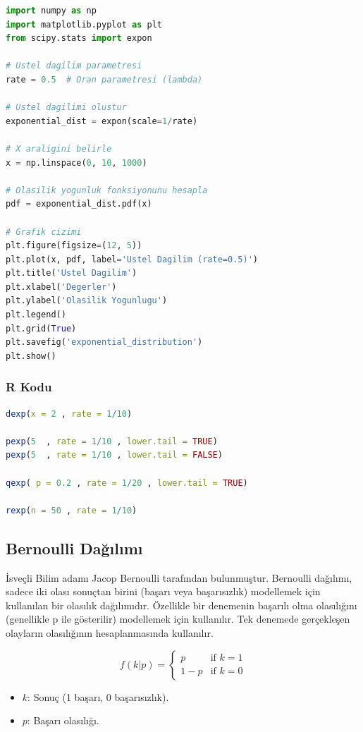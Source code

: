 \begin{lstlisting}[language=Python]
import numpy as np
import matplotlib.pyplot as plt
from scipy.stats import expon

# Ustel dagilim parametresi
rate = 0.5  # Oran parametresi (lambda)

# Ustel dagilimi olustur
exponential_dist = expon(scale=1/rate)

# X araligini belirle
x = np.linspace(0, 10, 1000)

# Olasilik yogunluk fonksiyonunu hesapla
pdf = exponential_dist.pdf(x)

# Grafik cizimi
plt.figure(figsize=(12, 5))
plt.plot(x, pdf, label='Ustel Dagilim (rate=0.5)')
plt.title('Ustel Dagilim')
plt.xlabel('Degerler')
plt.ylabel('Olasilik Yogunlugu')
plt.legend()
plt.grid(True)
plt.savefig('exponential_distribution')
plt.show()
\end{lstlisting}

\subsubsection{R Kodu}

\begin{lstlisting}[language=R]
dexp(x = 2 , rate = 1/10)

pexp(5  , rate = 1/10 , lower.tail = TRUE)
pexp(5  , rate = 1/10 , lower.tail = FALSE)

qexp( p = 0.2 , rate = 1/20 , lower.tail = TRUE)

rexp(n = 50 , rate = 1/10)
\end{lstlisting}

\newpage

\subsection{Bernoulli Dağılımı}
İsveçli Bilim adamı Jacop Bernoulli tarafından bulunmuştur. Bernoulli dağılımı, sadece iki olası sonuçtan birini (başarı veya başarısızlık) modellemek için kullanılan bir olasılık dağılımıdır. Özellikle bir denemenin başarılı olma olasılığını (genellikle p ile gösterilir) modellemek için kullanılır. Tek denemede gerçekleşen olayların olasılığının hesaplanmasında kullanılır.

\[f(k|p) = \begin{cases} p & \text{if } k = 1 \\ 1 - p & \text{if } k = 0 \end{cases}\]
\begin{itemize}
	\item $k$: Sonuç (1 başarı, 0 başarısızlık).
	\item $p$: Başarı olasılığı.
\end{itemize}

